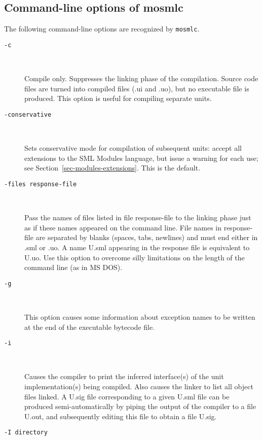 \documentclass[fleqn,a4paper]{article}
\begin{document}
\subsection{Command-line options of mosmlc}
\label{sec-mosmlc-options}

The following command-line options are recognized by {\tt mosmlc}.

\begin{description}
\item[{\tt -c}]\mbox{ }

  Compile only. Suppresses the linking phase of the compilation.
  Source code files are turned into compiled files (.ui and .uo), but
  no executable file is produced.  This option is useful for compiling
  separate units.

\item[{\tt -conservative}]\mbox{ }
  
  Sets conservative mode for compilation of subsequent units: accept
  all extensions to the SML Modules language, but issue a warning for
  each use; see Section~\ref{sec-modules-extensions}.  This is the
  default.

\item[{\tt -files {\rm response-file}}]\mbox{ }

  Pass the names of files listed in file response-file to the linking
  phase just as if these names appeared on the command line.  File
  names in response-file are separated by blanks (spaces, tabs,
  newlines) and must end either in .sml or .uo.  A name U.sml
  appearing in the response file is equivalent to U.uo.  Use this
  option to overcome silly limitations on the length of the
  command line (as in MS DOS).

\item[{\tt -g}]\mbox{ }

  This option causes some information about exception names to be
  written at the end of the executable bytecode file.  

\item[{\tt -i}]\mbox{ }
  
  Causes the compiler to print the inferred interface(s) of the unit
  implementation(s) being compiled.  Also causes the linker to list
  all object files linked.  A U.sig file corresponding to a given
  U.sml file can be produced semi-automatically by piping the output
  of the compiler to a file U.out, and subsequently editing this file
  to obtain a file U.sig.

\item[{\tt -I {\rm directory}}]\mbox{ }
  

\end{description}
\end{document}
